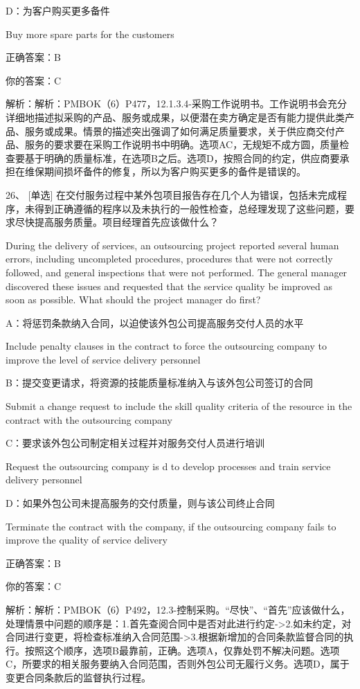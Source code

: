 D：为客户购买更多备件

Buy more spare parts for the customers

正确答案：B

你的答案：C

解析：解析：PMBOK（6）P477，12.1.3.4-采购工作说明书。工作说明书会充分详细地描述拟采购的产品、服务或成果，以便潜在卖方确定是否有能力提供此类产品、服务或成果。情景的描述突出强调了如何满足质量要求，关于供应商交付产品、服务的要求要在采购工作说明书中明确。选项AC，无规矩不成方圆，质量检查要基于明确的质量标准，在选项B之后。选项D，按照合同的约定，供应商要承担在维保期间损坏备件的修复，所以为客户购买更多的备件是错误的。

26、 [单选] 在交付服务过程中某外包项目报告存在几个人为错误，包括未完成程序，未得到正确遵循的程序以及未执行的一般性检查，总经理发现了这些问题，要求尽快提高服务质量。项目经理首先应该做什么？

During the delivery of services, an outsourcing project reported several human errors, including uncompleted procedures, procedures that were not correctly followed, and general inspections that were not performed. The general manager discovered these issues and requested that the service quality be improved as soon as possible. What should the project manager do first?

A：将惩罚条款纳入合同，以迫使该外包公司提高服务交付人员的水平

Include penalty clauses in the contract to force the outsourcing company to improve the level of service delivery personnel

B：提交变更请求，将资源的技能质量标准纳入与该外包公司签订的合同

Submit a change request to include the skill quality criteria of the resource in the contract with the outsourcing company

C：要求该外包公司制定相关过程并对服务交付人员进行培训

Request the outsourcing company is d to develop processes and train service delivery personnel

D：如果外包公司未提高服务的交付质量，则与该公司终止合同

Terminate the contract with the company, if the outsourcing company fails to improve the quality of service delivery

正确答案：B

你的答案：C

解析：解析：PMBOK（6）P492，12.3-控制采购。“尽快”、“首先”应该做什么，处理情景中问题的顺序是：1.首先查阅合同中是否对此进行约定->2.如未约定，对合同进行变更，将检查标准纳入合同范围->3.根据新增加的合同条款监督合同的执行。按照这个顺序，选项B最靠前，正确。选项A，仅靠处罚不解决问题。选项C，所要求的相关服务要纳入合同范围，否则外包公司无履行义务。选项D，属于变更合同条款后的监督执行过程。



